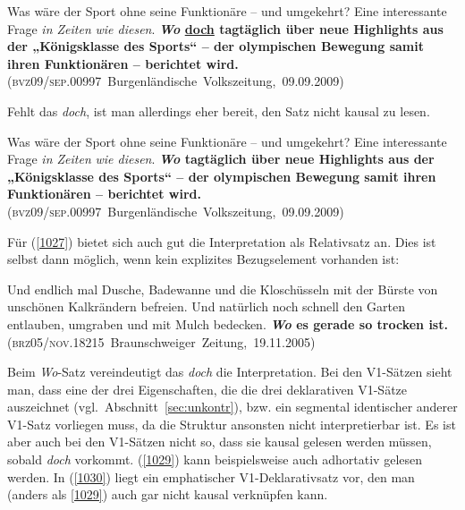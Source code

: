 \begin{exe}
	\ex\label{1026}
	  
	Was wäre der Sport ohne seine Funktionäre – und umgekehrt? Eine interessante Frage \emph{in Zeiten} \emph{wie diesen}. \textbf{\textit{Wo} \ul{doch} 		tagtäglich über neue Highlights aus der „Königsklasse des Sports“ – der olympischen Bewegung samit ihren Funktionären – berichtet wird.}\hfill\relax [verändert S.M.]
	\newline
	\hbox{}\hfill\hbox{(\textsc{bvz09/sep.00997} Burgenländische Volkszeitung, 09.09.2009)}
\end{exe}	
Fehlt das \textit{doch}, ist man allerdings eher bereit, den Satz nicht kausal zu lesen. 

\begin{exe}
	\ex\label{1027}
 
	Was wäre der Sport ohne seine Funktionäre – und umgekehrt? Eine interessante Frage \emph{in Zeiten} \emph{wie diesen}. \textbf{\textit{Wo} tagtäglich über 		neue Highlights aus der „Königsklasse des Sports“ – der olympischen Bewegung samit ihren Funktionären – berichtet wird.}
	\newline
	\hbox{}\hfill\hbox{(\textsc{bvz09/sep.00997} Burgenländische Volkszeitung, 09.09.2009)}
\end{exe}                                    
Für (\ref{1027}) bietet sich auch gut die Interpretation als Relativsatz an. Dies ist selbst dann möglich, wenn kein explizites Bezugselement vorhanden ist:

\begin{exe}
	\ex\label{1028}
	  
	Und endlich mal Dusche, Badewanne und die Kloschüsseln mit der Bürste von unschönen Kalkrändern befreien. Und natürlich noch schnell den Garten 			entlauben, umgraben und mit Mulch bedecken. \textbf{\textit{Wo} es gerade so trocken ist.}    
	\hfill\hbox{(\textsc{brz05/nov.18215} Braunschweiger Zeitung, 19.11.2005)}
\end{exe}                                                                        
Beim \textit{Wo}-Satz vereindeutigt das \textit{doch} die Interpretation. Bei den V1-Sätzen sieht man, dass eine der drei Eigenschaften, die die drei deklarativen V1-Sätze aus\-zeichnet (vgl.\ Abschnitt~\ref{sec:unkontr}), bzw. ein segmental identischer anderer V1-Satz vorliegen muss, da die Struktur ansonsten nicht interpretierbar ist. Es ist aber auch bei den V1-Sätzen nicht so, dass sie kausal gelesen werden müssen, sobald \textit{doch} vorkommt. (\ref{1029}) kann beispielsweise auch adhortativ  gelesen werden. In (\ref{1030}) liegt ein  emphatischer V1-Deklarativsatz vor, den man (anders als \ref{1029}) auch gar nicht kausal verknüpfen kann.

